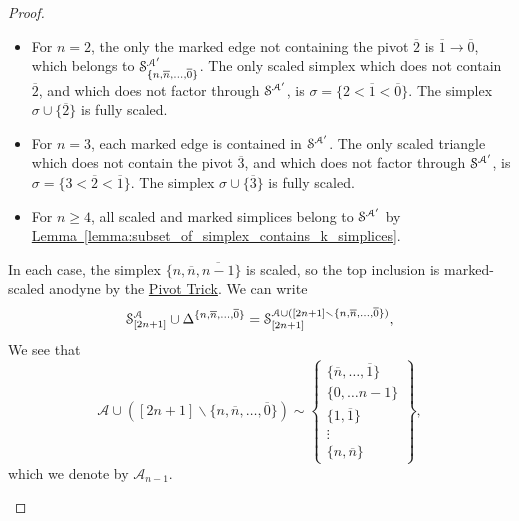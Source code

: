\documentclass[main.tex]{subfiles}
\begin{document}
\begin{proof}
\begin{enumerate}
\begin{itemize}
          \begin{itemize}
            \item For $n = 2$, the only the marked edge not containing the pivot $\overline{2}$ is $\overline{1} \to \overline{0}$, which belongs to $\S^{\mathcal{A}'}_{\{n, \overline{n}, \ldots, \overline{0}\}}$. The only scaled simplex which does not contain $\overline{2}$, and which does not factor through $\S^{\mathcal{A}'}$, is $\sigma = \{2 < \overline{1} < \overline{0}\}$. The simplex $\sigma \cup \{\overline{2}\}$ is fully scaled.

            \item For $n = 3$, each marked edge is contained in $\S^{\mathcal{A}'}$. The only scaled triangle which does not contain the pivot $\overline{3}$, and which does not factor through $\S^{\mathcal{A}'}$, is $\sigma = \{3 < \overline{2} < \overline{1}\}$. The simplex $\sigma \cup \{\overline{3}\}$ is fully scaled.

            \item For $n \geq 4$, all scaled and marked simplices belong to $\S^{\mathcal{A}'}$ by \hyperref[lemma:subset_of_simplex_contains_k_simplices]{Lemma~\ref*{lemma:subset_of_simplex_contains_k_simplices}}.
          \end{itemize}
          In each case, the simplex $\{n, \overline{n}, \overline{n-1}\}$ is scaled, so the top inclusion is marked-scaled anodyne by the \hyperref[lemma:pivot_trick]{Pivot Trick}. We can write
          \begin{equation*}
            \S^{\mathcal{A}}_{[2n+1]} \cup \Delta^{\{n, \overline{n}, \ldots, \overline{0}\}} = \S^{\mathcal{A} \cup ([2n+1] \smallsetminus \{n, \overline{n}, \ldots, \overline{0}\})}_{[2n+1]},
          \end{equation*}
          We see that
          \begin{equation*}
            \mathcal{A} \cup ([2n+1] \smallsetminus \{n, \overline{n}, \ldots, \overline{0}\}) \sim \left\{ \substack{ \{\overline{n}, \ldots, \overline{1}\} \\ \{0, \ldots n-1\} \\ \{1, \overline{1}\} \\ \vdots \\ \{n, \overline{n}\} } \right\},
          \end{equation*}
          which we denote by $\mathcal{A}_{n-1}$.


\end{itemize}
\end{enumerate}
\end{proof}
\end{document}
